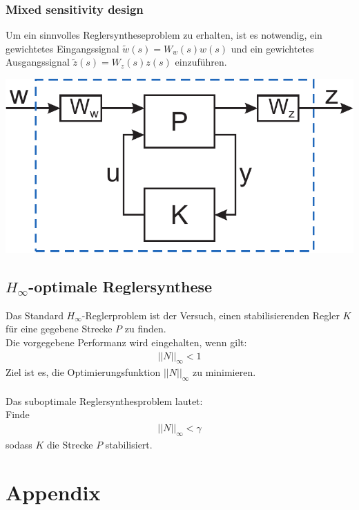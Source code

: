 \documentclass[a4paper,twocolumn,10pt]{article}
\begin{document}
\subsubsection{Mixed sensitivity design}
Um ein sinnvolles Reglersyntheseproblem zu erhalten, ist es notwendig, ein gewichtetes Eingangssignal $\tilde{w}(s)=W_w(s)w(s)$ und ein gewichtetes Ausgangssignal $\tilde{z}(s)=W_z(s)z(s)$ einzuführen.
\begin{center}
\includegraphics[width=0.8\columnwidth]{Grafiken/PK-Struktur_mit_Gewichten}
\end{center}

\subsection{$H_{\infty}$-optimale Reglersynthese}
Das Standard $H_{\infty}$-Reglerproblem ist der Versuch, einen stabilisierenden Regler $K$ für eine gegebene Strecke $P$ zu finden.\\
Die vorgegebene Performanz wird eingehalten, wenn gilt:
\begin{align*}
||N||_{\infty}<1
\end{align*}
Ziel ist es, die Optimierungsfunktion $||N||_{\infty}$ zu minimieren.\\\\
Das suboptimale Reglersynthesproblem lautet:\\
Finde
\begin{align*}
||N||_{\infty}<\gamma
\end{align*}
sodass $K$ die Strecke $P$ stabilisiert.

\section{Appendix}
\end{document}
